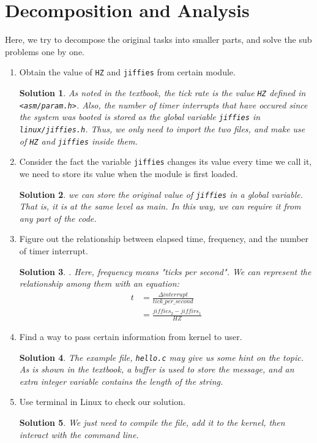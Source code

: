 \documentclass{article}
\newtheorem*{solution}{Solution}
\begin{document}
\section{Decomposition and Analysis}
Here, we try to decompose the original tasks into smaller parts, and solve the sub problems one by one.
\begin{enumerate}
    \item Obtain the value of \texttt{HZ} and \texttt{jiffies} from certain module.
    \begin{solution}
    As noted in the textbook, the tick rate is the value \texttt{HZ} defined in \texttt{<asm/param.h>}. Also, the number of timer interrupts that have occured since the system was booted is stored as the global variable \texttt{jiffies} in \texttt{linux/jiffies.h}. Thus, we only need to import the two files, and make use of \texttt{HZ} and \texttt{jiffies} inside them.
    \end{solution}
    
    \item Consider the fact the variable \texttt{jiffies} changes its value every time we call it, we need to store its value when the module is first loaded.
    \begin{solution}
        we can store the original value of \texttt{jiffies} in a global variable. That is, it is at the same level as main{}. In this way, we can require it from any part of the code. 
    \end{solution}
    \item Figure out the relationship between elapsed time, frequency, and the number of timer interrupt.
    \begin{solution}.   
        Here, frequency means "ticks per second". We can represent the relationship among them with an equation:
        \begin{align*}
            t &= \frac {\Delta interrupt} {tick\_per\_ second} \\
            &= \frac {jiffies_2 - jiffirs_1} {HZ}
        \end{align*}
    \end{solution}
    \item Find a way to pass certain information from kernel to user.
    \begin{solution}
    The example file, \texttt{hello.c} may give us some hint on the topic. As is shown in the textbook, a buffer is used to store the message, and an extra integer variable contains the length of the string.
    \end{solution}
    \item Use terminal in Linux to check our solution.
    \begin{solution}
    We just need to compile the file, add it to the kernel, then interact with the command line.
    \end{solution}
\end{enumerate}
\end{document}
